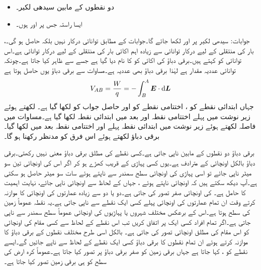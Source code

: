 \begin{itemize}
\item
دو نقطوں کے مابین سیدھی لکیر۔
\item
ایسا راستہ جس پر  اور  ہوں۔
\end{itemize}

جوابات: سیدھی لکیر پر  اور  لکھا جائے گا۔جوابات کے مطابق توانائی درکار نہیں بلکہ حاصل ہو گی۔،  
بار  کی منتقلی کے لیے درکار  توانائی سے زیادہ اہم  اکائی بار کی منتقلی کے لیے درکار توانائی ہے۔اس توانائی کو  کہتے  ہیں۔برقی دباؤ کی اکائی  کو  کا نام دیا گیا ہے جسے  سے ظاہر کیا جاتا ہے۔چونکہ توانائی عددیہ مقدار ہے لہٰذا برقی دباؤ بھی عددیہ ہے۔مساوات  سے برقی دباؤ یوں حاصل ہوتا ہے
\begin{align}\label{مساوات_توانائی_برقی_دباو_تعریف}
V_{AB}=\frac{W}{q}=-\int_{B}^{A} \kvec{E} \cdot \dif\kvec{L}
\end{align}
جہاں ابتدائی نقطے کو ، اختتامی نقطے کو  اور حاصل جواب کو  لکھا گیا ہے۔ لکھتے ہوئے زیر نوشت میں پہلے اختتامی نقطہ   اور بعد میں ابتدائی نقطہ  لکھا گیا ہے۔مساوات  میں فاصلہ  لکھتے ہوئے زیر نوشت میں ابتدائی نقطہ  پہلے اور اختتامی نقطہ  بعد میں لکھا گیا۔برقی دباؤ   لکھتے ہوئے اس فرق کو مدنظر رکھنا ہو گا۔

برقی دباؤ دو نقطوں کے مابین ناپی جاتی ہے۔کسی نقطے کی مطلق برقی دباؤ معنی نہیں رکھتی۔برقی دباؤ بالکل اونچائی کے مترادف ہے۔یوں کسی پہاڑی کے قریب کھڑے ہو کر اگر اس کی اونچائی تین سو میٹر ناپی جائے تو اسی پہاڑی کی اونچائی سطح سمندر سے ناپتے ہوئے سات سو میٹر حاصل ہو سکتی ہے۔آپ دیکھ سکتے ہیں کہ اونچائی ناپتے ہوئے ، جہاں کے لحاظ سے اونچائی ناپی جائے، نہایت اہمیت کا حامل  ہے۔ کی اونچائی صفر تصور کی جاتی ہے۔دو یا دو سے زیادہ  عمارتوں کی اونچائی کا موازنہ کرتے وقت ان تمام عمارتوں کی اونچائی پہلے کسی ایک نقطے سے ناپی جاتی ہے۔یہ نقطہ عموماً زمین کی سطح ہوتا ہے۔اس کے برعکس مختلف شہروں یا پہاڑیوں کی اونچائی عموماً سطح سمندر سے ناپی جاتی ہے۔اگر تمام افراد کسی ایک  پر اتفاق کریں تب اس نقطے کے لحاظ  سے کسی مقام کی اونچائی کو اس مقام کی مطلق اونچائی تصور کی جاتی ہے۔ بالکل اسی طرح مختلف نقطوں کے برقی دباؤ کا موازنہ کرتے ہوئے ان تمام نقطوں کا برقی دباؤ کسی ایک نقطے کے لحاظ سے ناپے جائیں گے۔ایسے نقطے کو ، کہا جاتا ہے جہاں برقی زمین کو صفر  برقی دباؤ پر تصور کیا جاتا ہے۔عموماً کرہ ارض کی سطح کو ہی برقی زمین تصور کیا جاتا ہے۔

